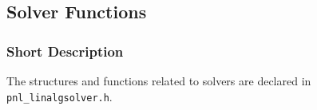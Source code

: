 





\subsection{Solver Functions}
\subsubsection{Short Description}

The structures and functions related to solvers are declared in
\verb!pnl_linalgsolver.h!. 


